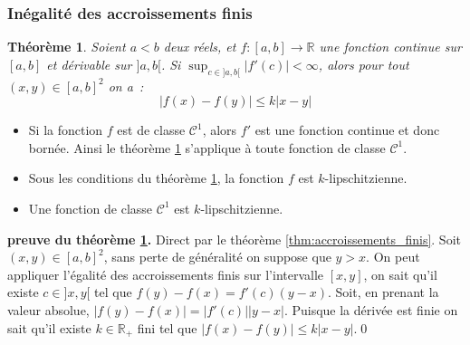 \documentclass[10pt,notheorems]{beamer}
\theoremstyle{plain}
\newtheorem{theorem}{Théorème}
\theoremstyle{definition} %
\begin{document}
\begin{frame}
  \frametitle{Inégalité des accroissements finis}
  \hypertarget{slide_inegalite_accroissements_finis_1}{}

  \begin{theorem}\label{thm:inegalite_accroissements_finis}
    Soient $a<b$ deux réels, et $f: [a,b]\rightarrow \mathbb R$ une fonction continue sur $[a, b]$ et dérivable sur $]a, b[$. Si $\sup_{c\in]a,b[}|f'(c)|<\infty$, alors pour tout $(x,y)\in[a,b]^2$ on a~:
    \[
      |f(x)-f(y)| \leq k |x-y|
    \]
  \end{theorem}

  \bigskip

  \begin{itemize}

  \item Si la fonction $f$ est de classe $\mathcal C^1$, alors $f'$ est une fonction continue et donc bornée. Ainsi le théorème \hyperlink{slide_inegalite_accroissements_finis_1}{\ref{thm:inegalite_accroissements_finis}} s'applique à toute fonction de classe $\mathcal C^1$.\newline

  \item Sous les conditions du théorème \hyperlink{slide_inegalite_accroissements_finis_1}{\ref{thm:inegalite_accroissements_finis}}, la fonction $f$ est $k$-lipschitzienne.\newline

  \item Une fonction de classe $\mathcal C^1$ est $k$-lipschitzienne.

  \end{itemize}

\end{frame}


\begin{notes}
  \textbf{preuve du théorème \hyperlink{slide_inegalite_accroissements_finis_1}{\ref{thm:inegalite_accroissements_finis}}.} Direct par le théorème \hyperlink{slide_accroissements_finis_1}{\ref{thm:accroissements_finis}}. Soit $(x,y)\in[a,b]^2$, sans perte de généralité on suppose que $y>x$. On peut appliquer l’égalité des accroissements finis sur l'intervalle $[x, y]$, on sait qu'il existe $c\in]x, y[$ tel que $f(y)− f(x) = f'(c)(y−x)$. Soit, en prenant la valeur absolue, $|f(y)− f(x)| = |f'(c)||y−x|$. Puisque la dérivée est finie on sait qu'il existe $k\in\mathbb R_+$ fini tel que $|f(x)− f(y)|≤ k|x− y|$.\qed

\end{notes}
\end{document}
